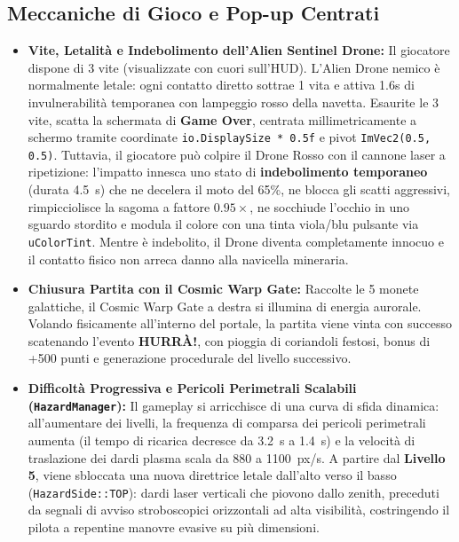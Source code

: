 \documentclass[11pt,a4paper]{article}
\begin{document}
\subsection{Meccaniche di Gioco e Pop-up Centrati}
\begin{itemize}
    \item \textbf{Vite, Letalità e Indebolimento dell'Alien Sentinel Drone:} Il giocatore dispone di 3 vite (visualizzate con cuori sull'HUD). L'Alien Drone nemico è normalmente letale: ogni contatto diretto sottrae 1 vita e attiva 1.6s di invulnerabilità temporanea con lampeggio rosso della navetta. Esaurite le 3 vite, scatta la schermata di \textbf{Game Over}, centrata millimetricamente a schermo tramite coordinate \texttt{io.DisplaySize * 0.5f} e pivot \texttt{ImVec2(0.5, 0.5)}. Tuttavia, il giocatore può colpire il Drone Rosso con il cannone laser a ripetizione: l'impatto innesca uno stato di \textbf{indebolimento temporaneo} (durata 4.5~s) che ne decelera il moto del 65\%, ne blocca gli scatti aggressivi, rimpicciolisce la sagoma a fattore $0.95\times$, ne socchiude l'occhio in uno sguardo stordito e modula il colore con una tinta viola/blu pulsante via \texttt{uColorTint}. Mentre è indebolito, il Drone diventa completamente innocuo e il contatto fisico non arreca danno alla navicella mineraria.
    \item \textbf{Chiusura Partita con il Cosmic Warp Gate:} Raccolte le 5 monete galattiche, il Cosmic Warp Gate a destra si illumina di energia aurorale. Volando fisicamente all'interno del portale, la partita viene vinta con successo scatenando l'evento \textbf{HURR\`A!}, con pioggia di coriandoli festosi, bonus di +500 punti e generazione procedurale del livello successivo.
    \item \textbf{Difficoltà Progressiva e Pericoli Perimetrali Scalabili (\texttt{HazardManager}):} Il gameplay si arricchisce di una curva di sfida dinamica: all'aumentare dei livelli, la frequenza di comparsa dei pericoli perimetrali aumenta (il tempo di ricarica decresce da 3.2~s a 1.4~s) e la velocità di traslazione dei dardi plasma scala da 880 a 1100~px/s. A partire dal \textbf{Livello 5}, viene sbloccata una nuova direttrice letale dall'alto verso il basso (\texttt{HazardSide::TOP}): dardi laser verticali che piovono dallo zenith, preceduti da segnali di avviso stroboscopici orizzontali ad alta visibilità, costringendo il pilota a repentine manovre evasive su più dimensioni.

\end{itemize}
\end{document}

